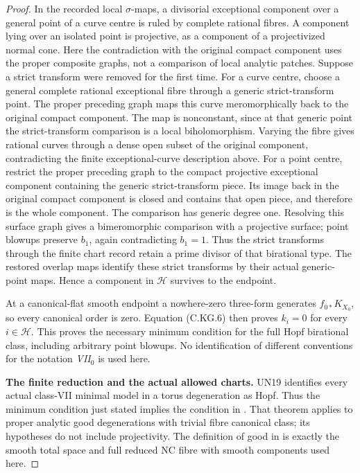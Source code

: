 \begin{proof}
In the recorded local $\sigma$-maps, a divisorial
exceptional component over a general point of a
curve centre is ruled by complete rational
fibres. A component lying over an isolated
point is projective, as a component of a
projectivized normal cone. Here the contradiction
with the original compact component uses the
proper composite graphs, not a comparison of
local analytic patches. Suppose a strict
transform were removed for the first time.
For a curve centre, choose a general complete
rational exceptional fibre through a generic
strict-transform point. The proper preceding
graph maps this curve meromorphically back to
the original compact component. The map is
nonconstant, since at that generic point the
strict-transform comparison is a local
biholomorphism. Varying the fibre gives
rational curves through a dense open subset
of the original component, contradicting the
finite exceptional-curve description above.
For a point centre, restrict the proper
preceding graph to the compact projective
exceptional component containing the generic
strict-transform piece. Its image back in
the original compact component is closed
and contains that open piece, and therefore
is the whole component. The comparison has
generic degree one. Resolving this surface
graph gives a bimeromorphic comparison with
a projective surface; point blowups preserve
$b_1$, again contradicting $b_1=1$.
Thus the strict transforms through the
finite chart record retain a prime divisor
of that birational type. The restored
overlap maps identify these strict transforms
by their actual generic-point maps. Hence a
component in $\mathcal H$ survives to the
endpoint.

At a canonical-flat smooth endpoint a nowhere-zero
three-form generates $f_{0*}K_{X_0}$, so every
canonical order is zero. Equation (C.KG.6) then
proves $k_i=0$ for every $i\in\mathcal H$.
This proves the necessary minimum condition for
the full Hopf birational class, including
arbitrary point blowups. No identification of
different conventions for the notation
\emph{VII$_0$} is used here.

\par\medskip\noindent\textbf{The finite reduction and the actual allowed charts.}
UN19 identifies every actual class-VII minimal
model in a torus degeneration as Hopf. Thus the
minimum condition just stated implies the
condition in \cite[Theorem~1']{Kulikov1981}.
That theorem applies to proper analytic good
degenerations with trivial fibre canonical
class; its hypotheses do not include
projectivity. The definition of good in
\cite[p.958]{Kulikov1977} is exactly the smooth
total space and full reduced NC fibre with
smooth components used here.


\end{proof}
